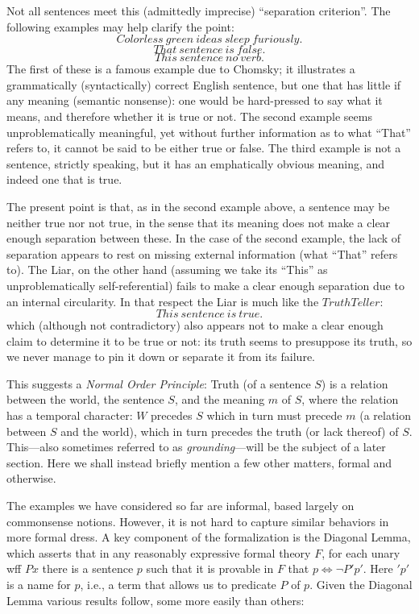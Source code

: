 \documentclass{amsart}
\begin{document}
Not all sentences meet 
this (admittedly imprecise) ``separation criterion''.  The
following examples may help clarify the point:
$$Colorless~ green~ ideas~ sleep~ furiously.$$
$$That~ sentence~ is ~ false.$$
$$This~ sentence~ no ~verb.$$
\smallskip
\noindent
The first of these is a famous example due to Chomsky; it illustrates
a grammatically (syntactically) correct English sentence, but one that
has little if any meaning (semantic nonsense): one would be
hard-pressed to say what it means, and therefore whether it is true or
not.  The second example
seems unproblematically meaningful, yet without further information as to
what ``That'' refers to, it cannot be said to be either true or
false. The third example is not a sentence, strictly speaking, but it
has an emphatically obvious meaning, and indeed one that is true.

The present point is that, as in the second example above, a sentence
may be neither true nor not true, in the sense that its meaning does
not make a clear enough separation between these. In the case of the second
example, the lack of separation appears to rest on missing external
information (what ``That'' refers to).  The Liar, on the other hand
(assuming we take its ``This'' as unproblematically self-referential)
fails to make a clear enough separation due to an internal
circularity.  In that respect the Liar is much like the $TruthTeller$:
$$This~ sentence~ is~ true.$$
\smallskip
\noindent
which (although not contradictory) also appears not to make a clear enough
claim to determine it to be true or not: its truth seems to presuppose
its truth, so we never manage to pin it down or separate it from its
failure.

This suggests a {\em Normal Order Principle}: Truth (of a sentence
$S$) is a relation between the world, the sentence $S$, and the
meaning $m$ of $S$, where the relation has a temporal character: $W$
precedes $S$ which in turn must precede $m$ (a relation between $S$
and the world), which in turn precedes the truth (or lack thereof) of
$S$.  This---also sometimes referred to as {\em grounding}---will be the
subject of a later section.  Here we shall instead briefly mention a
few other matters, formal and otherwise. 

The examples we have considered so far are informal, based largely on
commonsense notions. However, it is not hard to capture similar
behaviors in more formal dress.  A key component of the formalization
is the Diagonal Lemma, which asserts that in any reasonably expressive
formal theory $F$, for each unary wff $Px$ there is a sentence $p$ such that
it is provable in $F$ that $p \iff \neg P'p'$.  Here $'p'$ is
a name for $p$, i.e., a term that allows us to predicate $P$ of $p$.  Given
the Diagonal Lemma various results follow, some more easily than
others:
\end{document}
